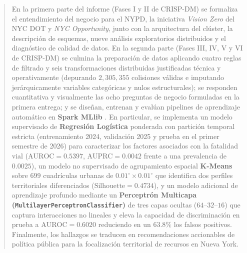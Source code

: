 \documentclass[11pt,a4paper]{article}
\begin{document}
\begin{abstract}
En la primera parte del informe (Fases I y II de CRISP-DM) se formaliza el entendimiento del negocio para el NYPD, la iniciativa \textit{Vision Zero} del NYC DOT y \textit{NYC Opportunity}, junto con la arquitectura del clúster, la descripción de esquemas, nueve análisis exploratorios distribuidos y el diagnóstico de calidad de datos. En la segunda parte (Fases III, IV, V y VI de CRISP-DM) se culmina la preparación de datos aplicando cuatro reglas de filtrado y seis transformaciones distribuidas justificadas técnica y operativamente (depurando $2,305,355$ colisiones válidas e imputando jerárquicamente variables categóricas y nulos estructurales); se responden cuantitativa y visualmente las ocho preguntas de negocio formuladas en la primera entrega; y se diseñan, entrenan y evalúan pipelines de aprendizaje automático en \textbf{Spark MLlib} \cite{meng2016mllib}. En particular, se implementa un modelo supervisado de \textbf{Regresión Logística} ponderada con partición temporal estricta (entrenamiento 2024, validación 2025 y prueba en el primer semestre de 2026) para caracterizar los factores asociados con la fatalidad vial ($\text{AUROC} = 0.5397$, $\text{AUPRC} = 0.0042$ frente a una prevalencia de $0.0025$), un modelo no supervisado de agrupamiento espacial \textbf{K-Means} sobre $699$ cuadrículas urbanas de $0.01^\circ \times 0.01^\circ$ que identifica dos perfiles territoriales diferenciados ($\text{Silhouette} = 0.4734$), y un modelo adicional de aprendizaje profundo mediante un \textbf{Perceptrón Multicapa (\texttt{MultilayerPerceptronClassifier})} de tres capas ocultas ($64\text{--}32\text{--}16$) que captura interacciones no lineales y eleva la capacidad de discriminación en prueba a $\text{AUROC} = 0.6020$ reduciendo en un $63.8\%$ los falsos positivos. Finalmente, los hallazgos se traducen en recomendaciones accionables de política pública para la focalización territorial de recursos en Nueva York.
\end{abstract}

\tableofcontents

\clearpage
{}
\setcounter{page}{1}






\end{document}
